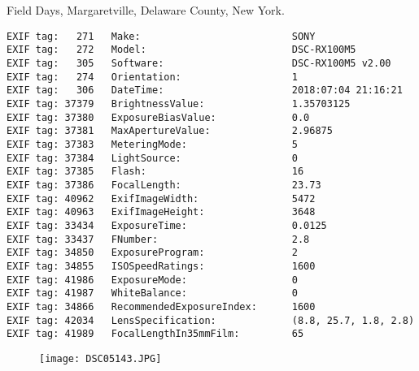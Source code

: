 \section{\protect{}}
\noindent Field Days, Margaretville, Delaware County, New York.
\noindent
\begin{lstlisting}
EXIF tag:   271   Make:                          SONY
EXIF tag:   272   Model:                         DSC-RX100M5
EXIF tag:   305   Software:                      DSC-RX100M5 v2.00
EXIF tag:   274   Orientation:                   1
EXIF tag:   306   DateTime:                      2018:07:04 21:16:21
EXIF tag: 37379   BrightnessValue:               1.35703125
EXIF tag: 37380   ExposureBiasValue:             0.0
EXIF tag: 37381   MaxApertureValue:              2.96875
EXIF tag: 37383   MeteringMode:                  5
EXIF tag: 37384   LightSource:                   0
EXIF tag: 37385   Flash:                         16
EXIF tag: 37386   FocalLength:                   23.73
EXIF tag: 40962   ExifImageWidth:                5472
EXIF tag: 40963   ExifImageHeight:               3648
EXIF tag: 33434   ExposureTime:                  0.0125
EXIF tag: 33437   FNumber:                       2.8
EXIF tag: 34850   ExposureProgram:               2
EXIF tag: 34855   ISOSpeedRatings:               1600
EXIF tag: 41986   ExposureMode:                  0
EXIF tag: 41987   WhiteBalance:                  0
EXIF tag: 34866   RecommendedExposureIndex:      1600
EXIF tag: 42034   LensSpecification:             (8.8, 25.7, 1.8, 2.8)
EXIF tag: 41989   FocalLengthIn35mmFilm:         65

\end{lstlisting}
\clearpage
\begin{figure}
\raggedleft
\texttt{[image: DSC05143.JPG]}
\end{figure}


\clearpage
